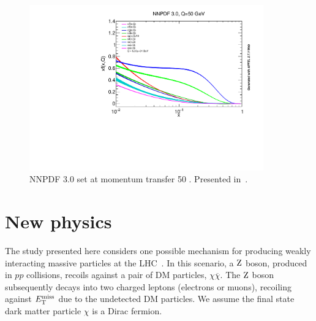 \begin{figure}[hbtp]
  \centering
    \includegraphics[width=0.90\textwidth]{figures/nnpdf30_115_Q50_v4.pdf}
  \caption{NNPDF 3.0 set at momentum transfer 50 \GeV. Presented in~\cite{nnpdf}.} 
  \label{fig:pdfq50}
\end{figure}

\section{New physics}
\label{sec:bsmtheory}

The study presented here considers one possible mechanism for producing weakly interacting massive particles at the LHC~\cite{Abercrombie:2015wmb}.
In this scenario, a $\mathrm{Z}$ boson, produced in $pp$ collisions, recoils against a pair of DM particles, $\chi\overline\chi$.
The $\mathrm{Z}$ boson subsequently decays into two charged leptons (electrons or muons), 
recoiling against $E_\mathrm{T}^{\mathrm{miss}}$ due to the undetected DM particles. 
We assume the final state dark matter particle $\chi$ is a Dirac fermion.

